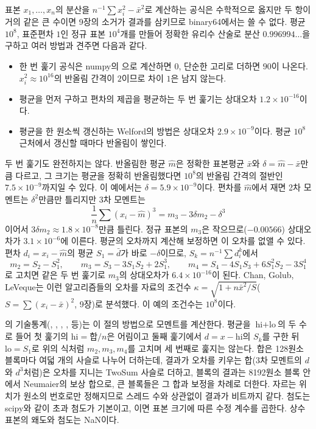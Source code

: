 표본 $x_1,\dots,x_n$의 분산을 $n^{-1}\sum x_i^2-\bar x^2$로 계산하는 공식은 수학적으로 옳지만 두 항이 거의 같은 큰 수이면 9장의 소거가 결과를 삼키므로 binary64에서는 쓸 수 없다. 평균 $10^8$, 표준편차 $1$인 정규 표본 $10^4$개를 만들어 정확한 유리수 산술로 분산 $0.996994\ldots$을 구하고 여러 방법과 견주면 다음과 같다.
\begin{itemize}
\item 한 번 훑기 공식은 numpy의 으로 계산하면 $0$, 단순한 고리로 더하면 $90$이 나온다. $x_i^2\approx10^{16}$의 반올림 간격이 $2$이므로 차이 $1$은 남지 않는다.
\item 평균을 먼저 구하고 편차의 제곱을 평균하는 두 번 훑기는 상대오차 $1.2\times10^{-16}$이다.
\item 평균을 한 원소씩 갱신하는 Welford의 방법\cite{welford1962}은 상대오차 $2.9\times10^{-9}$이다. 평균 $10^8$ 근처에서 갱신할 때마다 반올림이 쌓인다.
\end{itemize}
두 번 훑기도 완전하지는 않다. 반올림한 평균 $\hat m$은 정확한 표본평균 $\bar x$와 $\delta=\hat m-\bar x$만큼 다르고, 그 크기는 평균을 정확히 반올림했다면 $10^8$의 반올림 간격의 절반인 $7.5\times10^{-9}$까지일 수 있다. 이 예에서는 $\delta=5.9\times10^{-9}$이다. 편차를 $\hat m$에서 재면 2차 모멘트는 $\delta^2$만큼만 틀리지만 3차 모멘트는
\[
\frac1n\sum(x_i-\hat m)^3=m_3-3\delta m_2-\delta^3
\]
이어서 $3\delta m_2\approx1.8\times10^{-8}$만큼 틀린다. 정규 표본의 $m_3$은 작으므로($-0.00566$) 상대오차가 $3.1\times10^{-6}$에 이른다. 평균의 오차까지 계산해 보정하면 이 오차를 없앨 수 있다. 편차 $d_i=x_i-\hat m$의 평균 $S_1=\bar d$가 바로 $-\delta$이므로, $S_k=n^{-1}\sum d_i^k$에서
\[
m_2=S_2-S_1^2,\qquad m_3=S_3-3S_1S_2+2S_1^3,\qquad m_4=S_4-4S_1S_3+6S_1^2S_2-3S_1^4
\]
로 고치면 같은 두 번 훑기로 $m_3$의 상대오차가 $6.4\times10^{-16}$이 된다. Chan, Golub, LeVeque는 이런 알고리즘들의 오차를 자료의 조건수 $\kappa=\sqrt{1+n\bar x^2/S}$($S=\sum(x_i-\bar x)^2$, 9장)로 분석했다\cite{chan1983variance}. 이 예의 조건수는 $10^8$이다.

\begin{instardust}
의 기술통계(, , , ,  등)는 이 절의 방법으로 모멘트를 계산한다. 평균을 $\text{hi}+\text{lo}$의 두 수로 들어 첫 훑기의 $\text{hi}=\text{합}/n$은 어림이고 둘째 훑기에서 $d=x-\text{hi}$의 $S_k$를 구한 뒤 $\text{lo}=S_1$로 위의 식처럼 $m_2,m_3,m_4$를 고치며 세 번째로 훑지는 않는다. 합은 128원소 블록마다 여덟 개의 사슬로 나누어 더하는데, 결과가 오차를 키우는 합(3차 모멘트의 $d$와 $d^3$처럼)은 오차를 지니는 TwoSum 사슬로 더하고, 블록의 결과는 8192원소 블록 안에서 Neumaier의 보상 합으로, 큰 블록들은 그 합과 보정을 차례로 더한다. 자르는 위치가 원소의 번호로만 정해지므로 스레드 수와 상관없이 결과가 비트까지 같다. 첨도는 scipy와 같이 초과 첨도가 기본이고, 이면 표본 크기에 따른 수정 계수를 곱한다. 상수 표본의 왜도와 첨도는 NaN이다.
\end{instardust}

